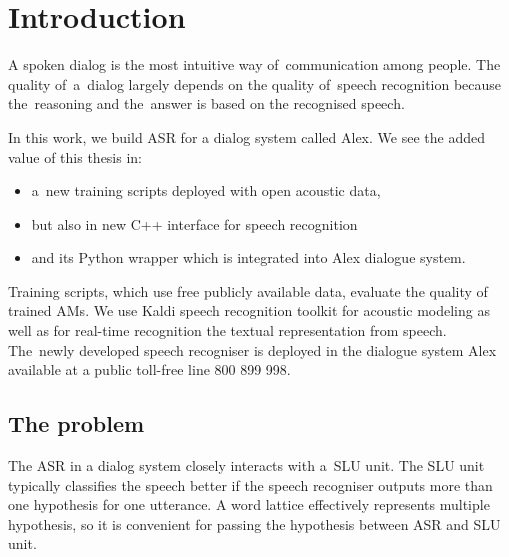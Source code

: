 \chapter{Introduction}
\label{cha:intro}

A spoken dialog is the most intuitive way of~communication among people. 
The quality of~a~dialog largely depends on the quality of~speech recognition because the~reasoning and the~answer is based on the recognised speech. 

In this work, we build \acl{ASR} for a dialog system called Alex. 
We see the added value of this thesis in:
\begin{itemize}
    \item a~new training scripts deployed with open acoustic data\cite{korvas_2014}, 
    \item but also in new C++ interface for speech recognition 
    \item and its Python wrapper which is integrated into Alex dialogue system. 
\end{itemize}
Training scripts, which use free publicly available data, evaluate the quality of trained \aclp{AM}.
We use Kaldi speech recognition toolkit\cite{povey2011kaldi} for acoustic modeling as well as for real-time recognition the textual representation from speech.
The~newly developed speech recogniser is deployed in the dialogue system Alex available at a public toll-free line 800 899 998. 


\section{The problem} 
\label{sec:problem}

The \ac{ASR} in a dialog system closely interacts with a~\acl{SLU} unit.
The \ac{SLU} unit typically classifies the speech better if the speech recogniser outputs more than one hypothesis for one utterance. 
A word lattice effectively represents multiple hypothesis, so it is convenient for passing the hypothesis between \ac{ASR} and \ac{SLU} unit.

